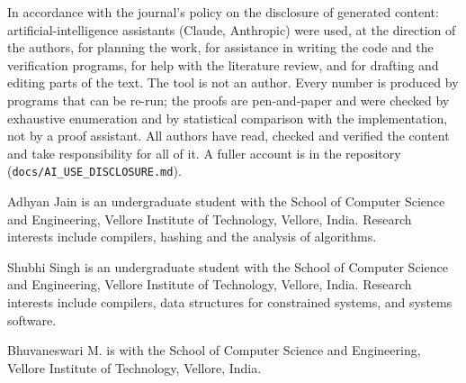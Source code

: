 \documentclass{ieeeaccess}
\newcommand{\code}[1]{\texttt{#1}}
\begin{document}
In accordance with the journal's policy on the disclosure of generated content: artificial-intelligence assistants (Claude, Anthropic) were used, at the direction of the authors, for planning the work, for assistance in writing the code and the verification programs, for help with the literature review, and for drafting and editing parts of the text. The tool is not an author. Every number is produced by programs that can be re-run; the proofs are pen-and-paper and were checked by exhaustive enumeration and by statistical comparison with the implementation, not by a proof assistant. All authors have read, checked and verified the content and take responsibility for all of it. A fuller account is in the repository (\code{docs/AI\_USE\_DISCLOSURE.md}).




\begin{IEEEbiographynophoto}{Adhyan Jain}
is an undergraduate student with the School of Computer Science and Engineering, Vellore Institute of Technology, Vellore, India. Research interests include compilers, hashing and the analysis of algorithms.
\end{IEEEbiographynophoto}

\begin{IEEEbiographynophoto}{Shubhi Singh}
is an undergraduate student with the School of Computer Science and Engineering, Vellore Institute of Technology, Vellore, India. Research interests include compilers, data structures for constrained systems, and systems software.
\end{IEEEbiographynophoto}

\begin{IEEEbiographynophoto}{Bhuvaneswari M.}
is with the School of Computer Science and Engineering, Vellore Institute of Technology, Vellore, India.
\end{IEEEbiographynophoto}

\EOD
\end{document}
